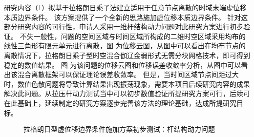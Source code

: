 研究内容（1）拟基于拉格朗日乘子法建立适用于任意节点离散的时域末端虚位移本质边界条件。
该方案提供了一个全新的思路施加虚位移本质边界条件。
针对这部分研究内容的可行性，申请人采用一维杆结构动力问题对此研究方案进行初步验证。
不失一般性，问题的空间区域与时间区域所构成的二维时空区域采用均布的线性三角形有限元单元进行离散，图  为位移云图，从图中可以看出在均布节点的离散情况下，拉格朗日乘子型时空混合伽辽金弱形式无需分块网格技术，即可得到稳定的数值结果。
图  为该问题的位移云图和位移误差收敛率分析，从图中可以看出该混合离散框架可以保证理论误差收敛率。
但是，当时间区域节点间距过大时，数值色散问题将导致计算结果出现振荡现象，需要本项目后续研究内容的成果解决此问题。从拉压杆动力测试当中可以初步数值验证所提研究方案可行，后续可在此基础上，延续制定的研究方案逐步完善该方法的理论基础，达成所提研究目标。

\begin{figure}[!h]
    \centering 

    \caption{拉格朗日型虚位移边界条件施加方案初步测试：杆结构动力问题}
    \label{fg:bar}
\end{figure}

